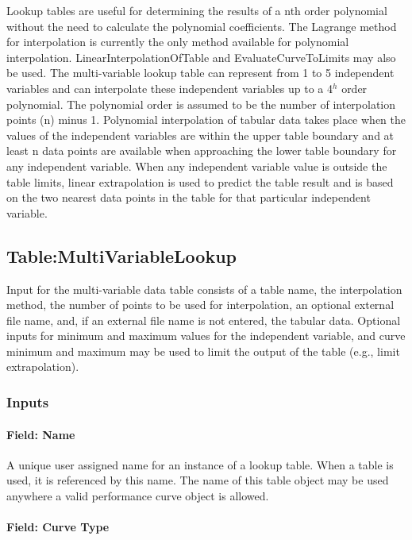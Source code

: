 Lookup tables are useful for determining the results of a nth order polynomial without the need to calculate the polynomial coefficients. The Lagrange method for interpolation is currently the only method available for polynomial interpolation. LinearInterpolationOfTable and EvaluateCurveToLimits may also be used. The multi-variable lookup table can represent from 1 to 5 independent variables and can interpolate these independent variables up to a 4\(^{h}\) order polynomial. The polynomial order is assumed to be the number of interpolation points (n) minus 1. Polynomial interpolation of tabular data takes place when the values of the independent variables are within the upper table boundary and at least n data points are available when approaching the lower table boundary for any independent variable. When any independent variable value is outside the table limits, linear extrapolation is used to predict the table result and is based on the two nearest data points in the table for that particular independent variable.

\subsection{Table:MultiVariableLookup}\label{tablemultivariablelookup}

Input for the multi-variable data table consists of a table name, the interpolation method, the number of points to be used for interpolation, an optional external file name, and, if an external file name is not entered, the tabular data. Optional inputs for minimum and maximum values for the independent variable, and curve minimum and maximum may be used to limit the output of the table (e.g., limit extrapolation).

\subsubsection{Inputs}\label{inputs-2-027}

\paragraph{Field: Name}\label{field-name-2-026}

A unique user assigned name for an instance of a lookup table. When a table is used, it is referenced by this name. The name of this table object may be used anywhere a valid performance curve object is allowed.

\paragraph{Field: Curve Type}\label{field-curve-type-2}

